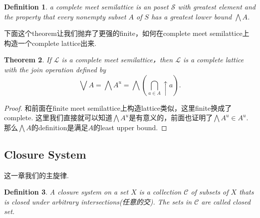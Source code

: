 \documentclass{article}
\newtheorem{theorem}{Theorem}[section]
\newtheorem{definition}[theorem]{Definition}
\newcommand\slattice{\mathcal{S}}
\newcommand\lattice{\mathcal{L}}
\begin{document}
\begin{definition}
\rm a {\color{red} complete meet semilattice} is an poset $\slattice$ with greatest element and the property that every nonempty subset $A$ of $S$ has a greatest lower bound $\bigwedge A$.
\end{definition}

{\color{red} 下面这个theorem让我们抛弃了更强的finite，如何在complete meet semilattice上构造一个complete lattice出来}.

\begin{theorem}
\rm If $\lattice$ is a complete meet semilattice，then $\lattice$ is a complete lattice with the join operation defined by
$$
\bigvee A = \bigwedge A^u = \bigwedge (\bigcap\limits_{a \in A} \uparrow a).
$$
\end{theorem}

\begin{proof}
和前面在finite meet semilattice上构造lattice类似，这里finite换成了complete. 这里我们直接就可以知道$\bigwedge A^u$是有意义的，前面也证明了$\bigwedge A^u \in A^u$. 那么$\bigwedge A$的definition是满足$A$的least upper bound.
\end{proof}

\newpage
\subsection{Closure System}

{\color{blue} 这一章我们的主旋律.
\begin{center}
\end{center}
}
\begin{definition}
\rm A {\color{red} closure system} on a set $X$ is a collection $\mathcal{C}$ of subsets of $X$ thats is closed under arbitrary intersections(任意的交). The sets in $\mathcal{C}$ are called closed set. 
\end{definition}
\end{document}
